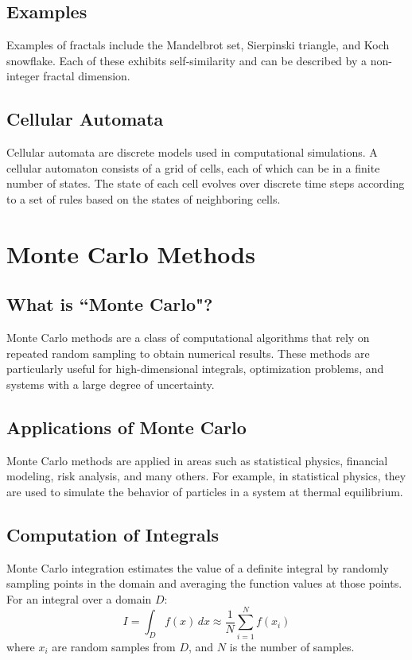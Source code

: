 \documentclass[12pt]{article}
\begin{document}
\subsection{Examples}
Examples of fractals include the Mandelbrot set, Sierpinski triangle, and Koch snowflake. Each of these exhibits self-similarity and can be described by a non-integer fractal dimension.

\subsection{Cellular Automata}
Cellular automata are discrete models used in computational simulations. A cellular automaton consists of a grid of cells, each of which can be in a finite number of states. The state of each cell evolves over discrete time steps according to a set of rules based on the states of neighboring cells.

\section{Monte Carlo Methods}
\subsection{What is ``Monte Carlo"?}
Monte Carlo methods are a class of computational algorithms that rely on repeated random sampling to obtain numerical results. These methods are particularly useful for high-dimensional integrals, optimization problems, and systems with a large degree of uncertainty.

\subsection{Applications of Monte Carlo}
Monte Carlo methods are applied in areas such as statistical physics, financial modeling, risk analysis, and many others. For example, in statistical physics, they are used to simulate the behavior of particles in a system at thermal equilibrium.

\subsection{Computation of Integrals}
Monte Carlo integration estimates the value of a definite integral by randomly sampling points in the domain and averaging the function values at those points. For an integral over a domain \( D \):
\[
I = \int_D f(x) \, dx \approx \frac{1}{N} \sum_{i=1}^N f(x_i)
\]
where \( x_i \) are random samples from \( D \), and \( N \) is the number of samples.
\end{document}
